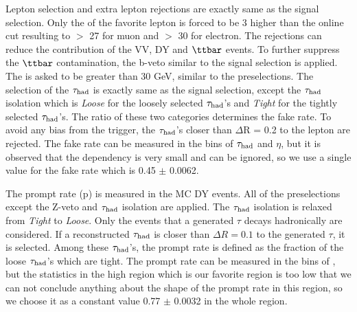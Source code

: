 Lepton selection and extra lepton rejections are exactly same as the signal selection. Only the \pt of the favorite lepton is forced to 
be 3 \GeV higher than the online cut resulting to \pt $>$ 27 \GeV for muon and \pt $>$ 30 \GeV for electron.
The rejections can reduce the contribution of the VV, DY and $\ttbar$ events. To further suppress the $\ttbar$ contamination, the b-veto 
similar to the signal selection is applied. The \MET is asked to be greater than 30 GeV, similar to the preselections. The selection of the $\tau_{\rm had}$ is 
exactly same as the signal selection, except the $\tau_{\rm had}$ isolation which is {\it Loose} for the loosely selected $\tau_{\rm had}$'s and {\it Tight} for the 
tightly selected $\tau_{\rm had}$'s.
The ratio of these two categories determines the fake rate. To avoid any bias from the trigger, the $\tau_{\rm had}$'s closer than $\Delta$R = 0.2 to the 
lepton are rejected. 
The fake rate can be measured in the bins of $\tau_{\rm had}$ \pt and $\eta$, but it is observed that the dependency is very small and can be ignored, 
so we use a single value for the fake rate which is    0.45 $\pm$ 0.0062.

The prompt rate (p) is measured in the MC DY events. All of the preselections except the Z-veto and $\tau_{\rm had}$ isolation are applied. The $\tau_{\rm had}$ isolation 
is relaxed from {\it Tight} to {\it Loose}. Only the events that a generated $\tau$ decays hadronically are considered. If a reconstructed $\tau_{\rm had}$ is 
closer than $\Delta R = 0.1$ to the generated $\tau$, it is selected. Among these $\tau_{\rm had}$'s, the prompt rate is defined as the fraction of the loose $\tau_{\rm had}$'s 
which are tight. The prompt rate can be measured in the bins of \mttwo, but the statistics in the high \mttwo region which is our favorite 
region is too low that we can not conclude anything about the shape of the prompt rate in this region, so we choose it as a constant value
0.77 $\pm$ 0.0032 in the whole \mttwo region.

